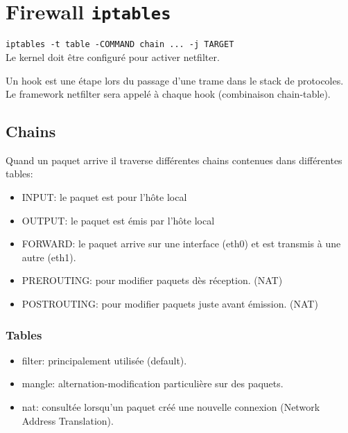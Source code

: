 \section{Firewall \texttt{iptables}}
\verb+iptables -t table -COMMAND chain ... -j TARGET+\\
Le kernel doit être configuré pour activer netfilter.

Un hook est une étape lors du passage d'une trame dans le stack de protocoles. Le framework netfilter sera appelé à chaque hook (combinaison chain-table).
\subsection{Chains}
Quand un paquet arrive il traverse différentes chains contenues dans différentes tables:
\begin{itemize}
    \item INPUT: le paquet est pour l'hôte local
    \item OUTPUT: le paquet est émis par l'hôte local
    \item FORWARD: le paquet arrive sur une interface (eth0) et est transmis à une autre (eth1).
    \item PREROUTING: pour modifier paquets dès réception. (NAT)
    \item POSTROUTING: pour modifier paquets juste avant émission. (NAT)
\end{itemize}
\subsubsection{Tables}
\begin{itemize}
    \item filter: principalement utilisée (default).
    \item mangle: alternation-modification particulière sur des paquets.
    \item nat: consultée lorsqu'un paquet créé une nouvelle connexion (Network Address Translation).
\end{itemize}
